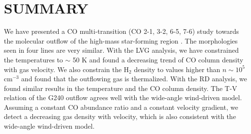 \section{SUMMARY}\label{summary}

We have presented a CO multi-transition (CO 2-1, 3-2, 6-5, 7-6) study towards the molecular outflow of the high-mass star-forming region . The morphologies seen in four lines are very similar. With the LVG analysis, we have constrained the temperatures to $\sim$ 50 K and found a decreasing trend of CO column density with gas velocity. We also constrain the H$_2$ density to values higher than $n \sim 10^5$ cm$^{-3}$ and found that the outflowing gas is thermalized. With the RD analysis, we found similar results in the temperature and the CO column density. The T-V relation of the G240 outflow agrees well with the wide-angle wind-driven model. Assuming a constant CO abundance
ratio and a constant velocity gradient, we detect a decreasing gas density with velocity, which is also consistent with the wide-angle wind-driven model. 